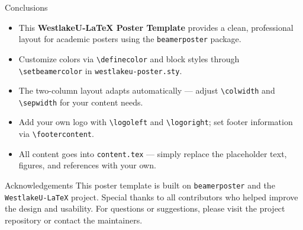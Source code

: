 \begin{frame}[t]
\begin{columns}[t]
\begin{column}{\colwidth}
  \begin{exampleblock}{Conclusions}
    \begin{itemize}
      \item This \textbf{WestlakeU-LaTeX Poster Template} provides a clean, professional layout for academic posters using the \texttt{beamerposter} package.
      \item Customize colors via \texttt{\textbackslash definecolor} and block styles through \texttt{\textbackslash setbeamercolor} in \texttt{westlakeu-poster.sty}.
      \item The two-column layout adapts automatically --- adjust \texttt{\textbackslash colwidth} and \texttt{\textbackslash sepwidth} for your content needs.
      \item Add your own logo with \texttt{\textbackslash logoleft} and \texttt{\textbackslash logoright}; set footer information via \texttt{\textbackslash footercontent}.
      \item All content goes into \texttt{content.tex} --- simply replace the placeholder text, figures, and references with your own.
    \end{itemize}
  \end{exampleblock}

  \begin{block}{Acknowledgements}
    This poster template is built on \texttt{beamerposter} and the \texttt{WestlakeU-LaTeX} project. Special thanks to all contributors who helped improve the design and usability. For questions or suggestions, please visit the project repository or contact the maintainers.
  \end{block}

\end{column}

\separatorcolumn
\end{columns}

\end{frame}